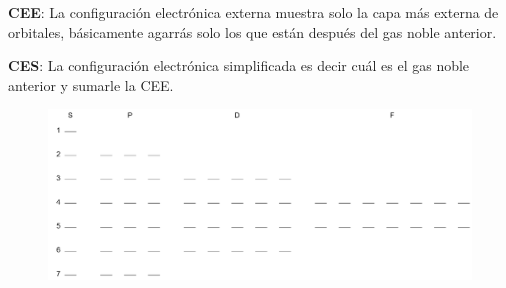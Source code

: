 \textbf{CEE}: La configuración electrónica externa muestra solo la capa más externa de orbitales, básicamente agarrás solo los que están después del gas noble anterior.

\textbf{CES}: La configuración electrónica simplificada es decir cuál es el gas noble anterior y sumarle la CEE.

\begin{figure}[H]
    \centering
    \includegraphics[width=0.8\linewidth]{Images/Orbitales.png}
\end{figure}

